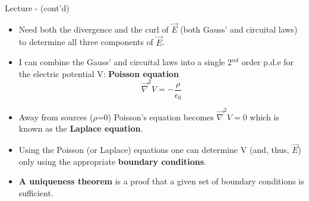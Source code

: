 \begin{frame}{Lecture \summarizedlecture - \lecturesummarytitle (cont'd)}

\begin{itemize}

  \item Need both the divergence and the curl of $\vec{E}$ (both Gauss' and circuital laws)
        to determine all three components of $\vec{E}$.

  \item I can combine the Gauss' and circuital laws into a single 2$^{nd}$ order p.d.e for the
        electric potential V: {\bf Poisson equation}
        \begin{equation*}
           \vec{\nabla}^{2} V = - \frac{\rho}{\epsilon_0}
        \end{equation*}

  \item Away from sources ($\rho$=0) Poisson's equation becomes $\vec{\nabla}^{2} V = 0$
        which is known as the {\bf Laplace equation}.

  \item Using the Poisson (or Laplace) equations one can determine V (and, thus, $\vec{E}$)
        only using the appropriate {\bf boundary conditions}.

  \item {\bf A uniqueness theorem} is a proof that a given set of boundary conditions is sufficient.

\end{itemize}

\end{frame}

